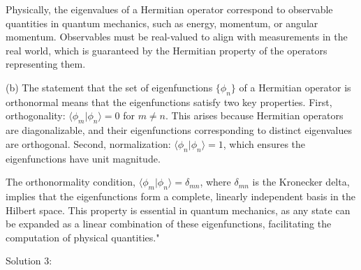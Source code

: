 Physically, the eigenvalues of a Hermitian operator correspond to observable quantities in quantum mechanics, such as energy, momentum, or angular momentum. Observables must be real-valued to align with measurements in the real world, which is guaranteed by the Hermitian property of the operators representing them.

(b) The statement that the set of eigenfunctions $\{\phi_n\}$ of a Hermitian operator is orthonormal means that the eigenfunctions satisfy two key properties. First, orthogonality: $\langle \phi_m | \phi_n \rangle = 0$ for $m \neq n$. This arises because Hermitian operators are diagonalizable, and their eigenfunctions corresponding to distinct eigenvalues are orthogonal. Second, normalization: $\langle \phi_n | \phi_n \rangle = 1$, which ensures the eigenfunctions have unit magnitude. 

The orthonormality condition, $\langle \phi_m | \phi_n \rangle = \delta_{mn}$, where $\delta_{mn}$ is the Kronecker delta, implies that the eigenfunctions form a complete, linearly independent basis in the Hilbert space. This property is essential in quantum mechanics, as any state can be expanded as a linear combination of these eigenfunctions, facilitating the computation of physical quantities."

Solution 3:


